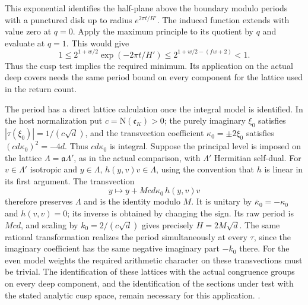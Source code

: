 This exponential identifies the half-plane above
the boundary modulo
periods with a punctured disk up to radius \(e^{2\pi t/H'}\).
The induced function extends with value zero at \(q=0\). Apply
the maximum principle to its quotient by \(q\) and evaluate at
\(q=1\). This would give
\[
  1\le 2^{1+w/2}\exp(-2\pi t/H')
       \le 2^{1+w/2-(fw+2)}<1 .
\]
Thus the cusp test implies the required minimum. Its application
on the actual deep covers needs the same period bound on every
component for the lattice used in the return count.

The period has a direct lattice calculation once the integral model
is identified. In the host normalization put
\(c=\mathrm N(\mathfrak c_K)>0\); the purely imaginary \(\xi_0\)
satisfies \(|\tau(\xi_0)|=1/(c\sqrt d)\), and the transvection
coefficient \(\kappa_0=\pm2\xi_0\) satisfies
\((cd\kappa_0)^2=-4d\). Thus \(cd\kappa_0\) is integral. Suppose
the principal level is imposed on the lattice
\(\Lambda=\mathfrak a\Lambda'\), as in the actual comparison, with
\(\Lambda'\) Hermitian self-dual. For \(v\in\Lambda'\) isotropic
and \(y\in\Lambda\), \(h(y,v)v\in\Lambda\), using the convention
that \(h\) is linear in its first argument. The transvection
\[
        y\longmapsto y+Mcd\kappa_0\,h(y,v)v
\]
therefore preserves \(\Lambda\) and is the identity modulo \(M\).
It is unitary by \(\bar\kappa_0=-\kappa_0\) and \(h(v,v)=0\);
its inverse is obtained by changing the sign. Its raw period is
\(Mcd\), and scaling by \(k_0=2/(c\sqrt d)\) gives precisely
\(H=2M\sqrt d\). The same rational transformation realizes the
period simultaneously at every \(\tau\), since the imaginary
coefficient has the same negative imaginary part \(-k_0\) there.
For the even model weights the required arithmetic
character on these transvections must be trivial. The identification
of these lattices with the actual congruence groups on every deep
component, and the identification of the sections under test with
the stated analytic cusp space, remain necessary for this application.
.

